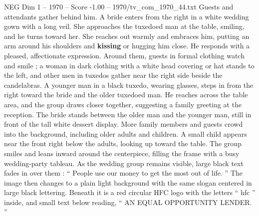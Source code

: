 \begin{textsample}{NEG Dim 1 – 1970 – Score -1.00 – 1970/tv\_com\_1970\_44.txt}
Guests and attendants gather behind him.
A bride enters from the right in a white wedding gown with a long veil.
She approaches the tuxedoed man at the table, smiling, and he turns toward her.
She reaches out warmly and embraces him, putting an arm around his shoulders and \textbf{kissing} or hugging him close.
He responds with a pleased, affectionate expression.
Around them, guests in formal clothing watch and smile ; a woman in dark clothing with a white head covering or hat stands to the left, and other men in tuxedos gather near the right side beside the candelabras.
A younger man in a black tuxedo, wearing glasses, steps in from the right toward the bride and the older tuxedoed man.
He reaches across the table area, and the group draws closer together, suggesting a family greeting at the reception.
The bride stands between the older man and the younger man, still in front of the tall white dessert display.
More family members and guests crowd into the background, including older adults and children.
A small child appears near the front right below the adults, looking up toward the table.
The group smiles and leans inward around the centerpiece, filling the frame with a busy wedding-party tableau.
As the wedding group remains visible, large black text fades in over them : “ People use our money to get the most out of life. ” The image then changes to a plain light background with the same slogan centered in large black lettering.
Beneath it is a red circular HFC logo with the letters “ hfc ” inside, and small text below reading, “ AN EQUAL OPPORTUNITY LENDER. ”

\end{textsample}
